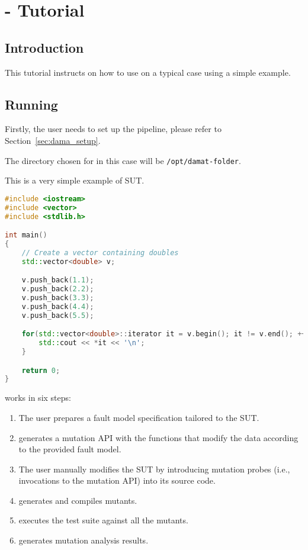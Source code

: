 
\chapter{\DAMA - Tutorial}

\section{Introduction}

This tutorial instructs on how to use \DAMA on a typical case using a simple example.

\section{Running \DAMA}
\label{sec:dama_single_machine}

Firstly, the user needs to set up the \DAMA pipeline, please refer to Section~\ref{sec:dama_setup}.

The directory chosen for \DAMA in this case will be \texttt{/opt/damat-folder}.

This is a very simple example of SUT.

\begin{lstlisting}[language=c++]
#include <iostream>
#include <vector>
#include <stdlib.h>

int main()
{
    // Create a vector containing doubles
    std::vector<double> v;

    v.push_back(1.1);
    v.push_back(2.2);
    v.push_back(3.3);
    v.push_back(4.4);
    v.push_back(5.5);

    for(std::vector<double>::iterator it = v.begin(); it != v.end(); ++it) {
    	std::cout << *it << '\n';
    }

    return 0;
}
\end{lstlisting}

\DAMA works in six steps:

\begin{enumerate}
	\item The user prepares a fault model specification tailored to the SUT.
	\item \DAMA generates a mutation API with the functions that modify the data according to the provided fault model.
	\item The user manually modifies the SUT by introducing mutation probes (i.e., invocations to the mutation API) into its source code.
	\item \DAMA generates and compiles mutants.
	\item \DAMA executes the test suite against all the mutants.
	\item \DAMA generates mutation analysis results.
\end{enumerate}


